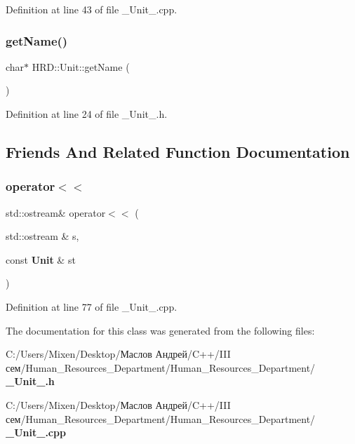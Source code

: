 Definition at line 43 of file \+\_\+\+Unit\+\_\+.\+cpp.

\mbox{\label{class_h_r_d_1_1_unit_ae182e56ce7319b2ff4824c5ba7a7f945}} 
\subsubsection{get\+Name()}
{\footnotesize\ttfamily char$\ast$ H\+R\+D\+::\+Unit\+::get\+Name (\begin{DoxyParamCaption}{ }\end{DoxyParamCaption})\hspace{0.3cm}{\ttfamily [inline]}}



Definition at line 24 of file \+\_\+\+Unit\+\_\+.\+h.



\subsection{Friends And Related Function Documentation}
\mbox{\label{class_h_r_d_1_1_unit_ac0bce1523e9a2843a631a23662ac239b}} 
\subsubsection{operator$<$$<$}
{\footnotesize\ttfamily std\+::ostream\& operator$<$$<$ (\begin{DoxyParamCaption}\item[{std\+::ostream \&}]{s,  }\item[{const \textbf{ Unit} \&}]{st }\end{DoxyParamCaption})\hspace{0.3cm}{\ttfamily [friend]}}



Definition at line 77 of file \+\_\+\+Unit\+\_\+.\+cpp.



The documentation for this class was generated from the following files\+:\begin{DoxyCompactItemize}
\item 
C\+:/\+Users/\+Mixen/\+Desktop/Маслов Андрей/\+C++/\+I\+I\+I сем/\+Human\+\_\+\+Resources\+\_\+\+Department/\+Human\+\_\+\+Resources\+\_\+\+Department/\textbf{ \+\_\+\+Unit\+\_\+.\+h}\item 
C\+:/\+Users/\+Mixen/\+Desktop/Маслов Андрей/\+C++/\+I\+I\+I сем/\+Human\+\_\+\+Resources\+\_\+\+Department/\+Human\+\_\+\+Resources\+\_\+\+Department/\textbf{ \+\_\+\+Unit\+\_\+.\+cpp}\end{DoxyCompactItemize}
